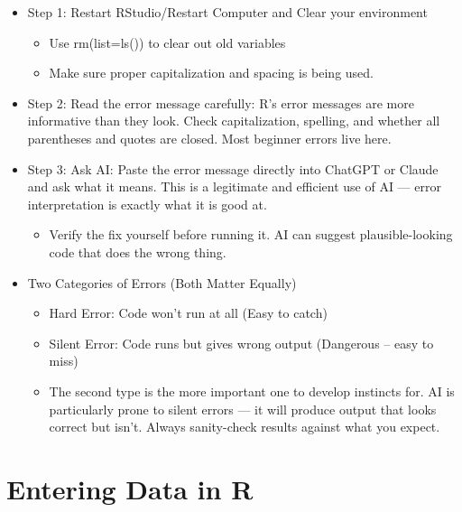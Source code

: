 \documentclass[
  letterpaper,
  DIV=11,
  numbers=noendperiod]{scrreprt}
\providecommand{\tightlist}{%
  \setlength{\itemsep}{0pt}\setlength{\parskip}{0pt}}\usepackage{longtable,booktabs,array}
\begin{document}
\begin{itemize}
\tightlist
\item
  Step 1: Restart RStudio/Restart Computer and Clear your environment

  \begin{itemize}
  \tightlist
  \item
    Use rm(list=ls()) to clear out old variables
  \item
    Make sure proper capitalization and spacing is being used.
  \end{itemize}
\item
  Step 2: Read the error message carefully: R's error messages are more
  informative than they look. Check capitalization, spelling, and
  whether all parentheses and quotes are closed. Most beginner errors
  live here.
\item
  Step 3: Ask AI: Paste the error message directly into ChatGPT or
  Claude and ask what it means. This is a legitimate and efficient use
  of AI --- error interpretation is exactly what it is good at.

  \begin{itemize}
  \tightlist
  \item
    Verify the fix yourself before running it. AI can suggest
    plausible-looking code that does the wrong thing.
  \end{itemize}
\item
  Two Categories of Errors (Both Matter Equally)

  \begin{itemize}
  \tightlist
  \item
    Hard Error: Code won't run at all (Easy to catch)
  \item
    Silent Error: Code runs but gives wrong output (Dangerous -- easy to
    miss)
  \item
    The second type is the more important one to develop instincts for.
    AI is particularly prone to silent errors --- it will produce output
    that looks correct but isn't. Always sanity-check results against
    what you expect.
  \end{itemize}
\end{itemize}


\chapter{Entering Data in R}\label{entering-data-in-r}
\end{document}
